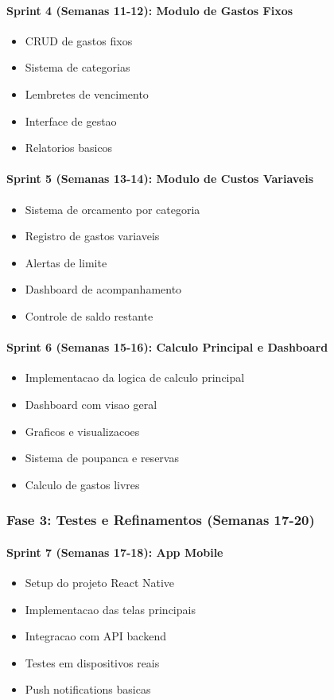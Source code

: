 \paragraph{Sprint 4 (Semanas 11-12): Modulo de Gastos Fixos}
\begin{itemize}
    \item CRUD de gastos fixos
    \item Sistema de categorias
    \item Lembretes de vencimento
    \item Interface de gestao
    \item Relatorios basicos
\end{itemize}

\paragraph{Sprint 5 (Semanas 13-14): Modulo de Custos Variaveis}
\begin{itemize}
    \item Sistema de orcamento por categoria
    \item Registro de gastos variaveis
    \item Alertas de limite
    \item Dashboard de acompanhamento
    \item Controle de saldo restante
\end{itemize}

\paragraph{Sprint 6 (Semanas 15-16): Calculo Principal e Dashboard}
\begin{itemize}
    \item Implementacao da logica de calculo principal
    \item Dashboard com visao geral
    \item Graficos e visualizacoes
    \item Sistema de poupanca e reservas
    \item Calculo de gastos livres
\end{itemize}

\subsubsection{Fase 3: Testes e Refinamentos (Semanas 17-20)}

\paragraph{Sprint 7 (Semanas 17-18): App Mobile}
\begin{itemize}
    \item Setup do projeto React Native
    \item Implementacao das telas principais
    \item Integracao com API backend
    \item Testes em dispositivos reais
    \item Push notifications basicas
\end{itemize}

